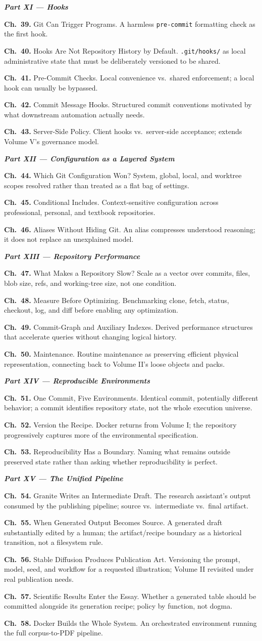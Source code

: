 \documentclass[11pt]{book}
\newcommand{\chapentry}[2]{\noindent\textbf{Ch.~#1.} #2\par\smallskip}
\newcommand{\partheading}[1]{\bigskip\noindent\textbf{\textit{#1}}\smallskip\par}
\begin{document}
\partheading{Part XI --- Hooks}
\chapentry{39}{Git Can Trigger Programs. A harmless \texttt{pre-commit} formatting check as the first hook.}
\chapentry{40}{Hooks Are Not Repository History by Default. \texttt{.git/hooks/} as local administrative state that must be deliberately versioned to be shared.}
\chapentry{41}{Pre-Commit Checks. Local convenience vs.\ shared enforcement; a local hook can usually be bypassed.}
\chapentry{42}{Commit Message Hooks. Structured commit conventions motivated by what downstream automation actually needs.}
\chapentry{43}{Server-Side Policy. Client hooks vs.\ server-side acceptance; extends Volume V's governance model.}

\partheading{Part XII --- Configuration as a Layered System}
\chapentry{44}{Which Git Configuration Won? System, global, local, and worktree scopes resolved rather than treated as a flat bag of settings.}
\chapentry{45}{Conditional Includes. Context-sensitive configuration across professional, personal, and textbook repositories.}
\chapentry{46}{Aliases Without Hiding Git. An alias compresses understood reasoning; it does not replace an unexplained model.}

\partheading{Part XIII --- Repository Performance}
\chapentry{47}{What Makes a Repository Slow? Scale as a vector over commits, files, blob size, refs, and working-tree size, not one condition.}
\chapentry{48}{Measure Before Optimizing. Benchmarking clone, fetch, status, checkout, log, and diff before enabling any optimization.}
\chapentry{49}{Commit-Graph and Auxiliary Indexes. Derived performance structures that accelerate queries without changing logical history.}
\chapentry{50}{Maintenance. Routine maintenance as preserving efficient physical representation, connecting back to Volume II's loose objects and packs.}

\partheading{Part XIV --- Reproducible Environments}
\chapentry{51}{One Commit, Five Environments. Identical commit, potentially different behavior; a commit identifies repository state, not the whole execution universe.}
\chapentry{52}{Version the Recipe. Docker returns from Volume I; the repository progressively captures more of the environmental specification.}
\chapentry{53}{Reproducibility Has a Boundary. Naming what remains outside preserved state rather than asking whether reproducibility is perfect.}

\partheading{Part XV --- The Unified Pipeline}
\chapentry{54}{Granite Writes an Intermediate Draft. The research assistant's output consumed by the publishing pipeline; source vs.\ intermediate vs.\ final artifact.}
\chapentry{55}{When Generated Output Becomes Source. A generated draft substantially edited by a human; the artifact/recipe boundary as a historical transition, not a filesystem rule.}
\chapentry{56}{Stable Diffusion Produces Publication Art. Versioning the prompt, model, seed, and workflow for a requested illustration; Volume II revisited under real publication needs.}
\chapentry{57}{Scientific Results Enter the Essay. Whether a generated table should be committed alongside its generation recipe; policy by function, not dogma.}
\chapentry{58}{Docker Builds the Whole System. An orchestrated environment running the full corpus-to-PDF pipeline.}
\end{document}
